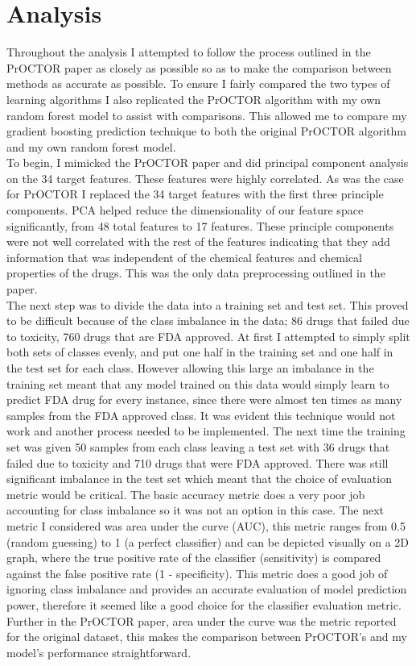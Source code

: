 \documentclass[12pt]{article}
\begin{document}
\section{Analysis}
Throughout the analysis I attempted to follow the process outlined in the PrOCTOR paper as closely as possible so as to make the comparison between methods as accurate as possible. To ensure I fairly compared the two types of learning algorithms I also replicated the PrOCTOR algorithm with my own random forest model to assist with comparisons. This allowed me to compare my gradient boosting prediction technique to both the original PrOCTOR algorithm and my own random forest model. \\
To begin, I mimicked the PrOCTOR paper and did principal component analysis on the 34 target features. These features were highly correlated. As was the case for PrOCTOR I replaced the 34 target features with the first three principle components. PCA helped reduce the dimensionality of our feature space significantly, from 48 total features to 17 features. These principle components were not well correlated with the rest of the features indicating that they add information that was independent of the chemical features and chemical properties of the drugs. This was the only data preprocessing outlined in the paper. \\
The next step was to divide the data into a training set and test set. This proved to be difficult because of the class imbalance in the data; 86 drugs that failed due to toxicity, 760 drugs that are FDA approved. At first I attempted to simply split both sets of classes evenly, and put one half in the training set and one half in the test set for each class. However allowing this large an imbalance in the training set meant that any model trained on this data would simply learn to predict FDA drug for every instance, since there were almost ten times as many samples from the FDA approved class. It was evident this technique would not work and another process needed to be implemented. The next time the training set was given 50 samples from each class leaving a test set with 36 drugs that failed due to toxicity and 710 drugs that were FDA approved. There was still significant imbalance in the test set which meant that the choice of evaluation metric would be critical. The basic accuracy metric does a very poor job accounting for class imbalance so it was not an option in this case. The next metric I considered was area under the curve (AUC), this metric ranges from 0.5 (random guessing) to 1 (a perfect classifier) and can be depicted visually on a 2D graph, where the true positive rate of the classifier (sensitivity) is compared against the false positive rate (1 - specificity). This metric does a good job of ignoring class imbalance and provides an accurate evaluation of model prediction power, therefore it seemed like a good choice for the classifier evaluation metric. Further in the PrOCTOR paper, area under the curve was the metric reported for the original dataset, this makes the comparison between PrOCTOR's and my model's performance straightforward. \\
\end{document}
